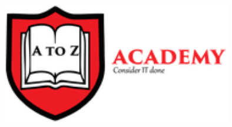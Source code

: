 \documentclass[12pt]{book}\usepackage{knitr}
\begin{document}
\begin{titlepage}
% 
%  
% 


\includegraphics[width=10cm]{./viz/icons/Logo.png}\\[1cm] %
 

\end{titlepage}
\end{document}
